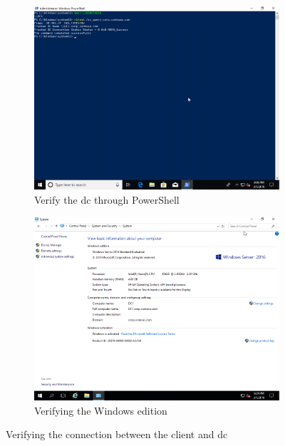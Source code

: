 \begin{figure}[h]\ContinuedFloat
	\begin{subfigure}{0.5\textwidth}
		\captionsetup{width=0.8\linewidth}
		\includegraphics[width=0.9\linewidth]{img/Methodologie/Prerequisites3.png}
		\centering
		\caption{Verify the \acrshort{dc} through PowerShell}
	\end{subfigure}
	\begin{subfigure}{0.5\textwidth}
		\captionsetup{width=0.8\linewidth}
		\includegraphics[width=0.9\linewidth]{img/Methodologie/Prerequisites4.png} 
		\centering	
		\caption{Verifying the Windows edition}
	\end{subfigure}
	\caption[Migration prerequisites]{Verifying the connection between the client and \acrshort{dc}}
	\label{fig:PrerequisitesMigration}
\end{figure}

